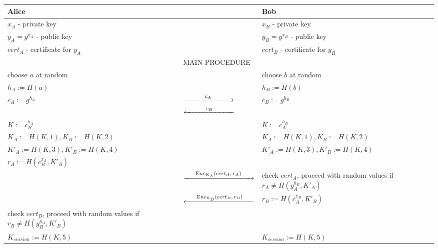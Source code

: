 \documentclass[border=0pt]{standalone}
\begin{document}
\newcommand{\newCA}{$c_A$}
\newcommand{\newCB}{$c_B$}
\newcommand{\newEncA}{$Enc_{K_A}(cert_A,r_A)$}
\newcommand{\newEncB}{$Enc_{K_B}(cert_B,r_B)$}
\begin{table}
	\centering
	\begin{tabular}{ | p{6.5cm} p{3.5cm} p{6.5cm} | }
		\hline
		Alice &  & Bob \\
		\hline
		$x_A$ - private key & & $x_B$ - private key \\
		$y_A = g^{x_A}$ - public key & & $y_B = g^{x_B}$ - public key \\
		$cert_A$ - certificate for $y_A$ & & $cert_B$ - certificate for $y_B$ \\
		\hline
		& MAIN PROCEDURE & \\
		\hline
		choose $a$ at random & & choose $b$ at random \\
		$h_A := H(a)$ & & $h_B := H(b)$ \\
		$c_A := g^{h_A}$ & $\xrightarrow{\text{\hspace{1cm}\text{\newCA}\hspace{1cm}}}$ & $c_B := g^{h_B}$ \\
		& $\xleftarrow{\text{\hspace{1cm}\text{\newCB}\hspace{1cm}}}$ & \\
		$K := c^{h_A}_{B}$ & & $K := c_{A}^{h_B}$ \\
		$K_A := H(K,1), K_B := H(K,2)$ & & $K_A := H(K,1), K_B := H(K,2)$  \\
		$K'_A := H(K,3), K'_B := H(K,4)$ & & $K'_A := H(K,3), K'_B := H(K,4)$ \\
		$r_A := H(c_{B}^{x_A},K'_A)$& & \\
		& $\xrightarrow{\text{\hspace{0.5cm}\text{\newEncA}\hspace{0.5cm}}}$ & check $cert_A$, proceed with random values if $r_A \neq H(y_{A}^{h_B}, K'_A)$ \\
		& $\xleftarrow{\text{\hspace{0.5cm}\text{\newEncB}\hspace{0.5cm}}}$ & $r_B := H(c_{A}^{x_B},K'_B)$ \\
		check $cert_B$, proceed with random values if $r_B \neq H(y_{B}^{h_A}, K'_B)$ & & \\
		$K_{session}:= H(K,5)$ & & $K_{session}:= H(K,5)$ \\
		\hline
	\end{tabular}
	\label{tab:singlebest}
		
\end{table}
\end{document}
